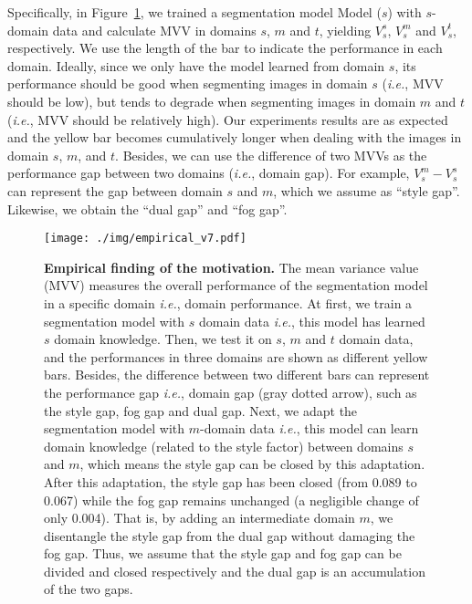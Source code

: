 \documentclass[10pt,twocolumn,letterpaper]{article}
\def\ie{\textit{i.e.}}
\def\imd{m}
\begin{document}
Specifically, in Figure~\ref{fig:empirical}, we trained a segmentation model Model ($s$) with $s$-domain data and calculate MVV in domains $s$, $m$ and $t$, yielding $V_{s}^{s}$, $V_{s}^{m}$ and $V_{s}^{t}$, respectively. We use the length of the bar to indicate the performance in each domain.
Ideally, since we only have the model learned from domain $s$, its performance should be good when segmenting images in domain $s$ (\ie, MVV should be low), but tends to degrade when segmenting images in domain $m$ and $t$ (\ie, MVV should be relatively high). Our experiments results are as expected and the yellow bar becomes cumulatively longer when dealing with the images in domain $s$, $m$, and $t$. 
Besides, we can use the difference of two MVVs as the performance gap between two domains (\ie, domain gap). For example, $V_{s}^{m}-V_{s}^{s}$ can represent the gap between domain $s$ and $m$, which we assume as ``style gap''. Likewise, we obtain the ``dual gap'' and ``fog gap''.


\begin{figure}[!tp]
    \centering
    \texttt{[image: ./img/empirical\_v7.pdf]}
    \caption{\textbf{Empirical finding of the motivation.} The mean variance value (MVV) measures the overall performance of the segmentation model in a specific domain \ie, domain performance.
    At first, we train a segmentation model with $s$ domain data \ie, this model has learned $s$ domain knowledge. Then, we test it on $s$, $m$ and $t$ domain data, and the performances in three domains are shown as different yellow bars. Besides, the difference between two different bars can represent the performance gap \ie, domain gap (gray dotted arrow), such as the style gap, fog gap and dual gap.
    Next, we adapt the segmentation model with $m$-domain data \ie, this model can learn domain knowledge (related to the style factor) between domains $s$ and $m$, which means the style gap can be closed by this adaptation.
    After this adaptation, the style gap has been closed (from 0.089 to 0.067) while the fog gap remains unchanged (a negligible change of only 0.004). 
    That is, by adding an intermediate domain $\imd$, we disentangle the style gap from the dual gap without damaging the fog gap.
    Thus, we assume that the style gap and fog gap can be divided and closed respectively and the dual gap is an accumulation of the two gaps.}
    \vspace{-4mm}
    \label{fig:empirical}
\end{figure}
\end{document}
